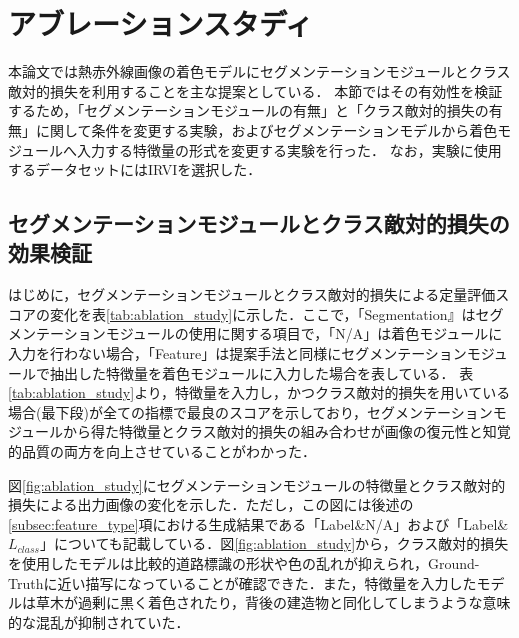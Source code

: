 \documentclass[11pt,dvipdfmx]{ujreport}
\begin{document}
\section{アブレーションスタディ}
本論文では熱赤外線画像の着色モデルにセグメンテーションモジュールとクラス敵対的損失を利用することを主な提案としている．
本節ではその有効性を検証するため，「セグメンテーションモジュールの有無」と「クラス敵対的損失の有無」に関して条件を変更する実験，およびセグメンテーションモデルから着色モジュールへ入力する特徴量の形式を変更する実験を行った．
なお，実験に使用するデータセットにはIRVIを選択した．\par

\subsection{セグメンテーションモジュールとクラス敵対的損失の効果検証}
\label{subsec:segmentation_and_class_loss}
はじめに，セグメンテーションモジュールとクラス敵対的損失による定量評価スコアの変化を表\ref{tab:ablation_study}に示した．ここで，「Segmentation』はセグメンテーションモジュールの使用に関する項目で，「N/A」は着色モジュールに入力を行わない場合，「Feature」は提案手法と同様にセグメンテーションモジュールで抽出した特徴量を着色モジュールに入力した場合を表している．
表\ref{tab:ablation_study}より，特徴量を入力し，かつクラス敵対的損失を用いている場合(最下段)が全ての指標で最良のスコアを示しており，セグメンテーションモジュールから得た特徴量とクラス敵対的損失の組み合わせが画像の復元性と知覚的品質の両方を向上させていることがわかった．\par
図\ref{fig:ablation_study}にセグメンテーションモジュールの特徴量とクラス敵対的損失による出力画像の変化を示した．ただし，この図には後述の\ref{subsec:feature_type}項における生成結果である「Label\&N/A」および「Label\&$L_{class}$」についても記載している．図\ref{fig:ablation_study}から，クラス敵対的損失を使用したモデルは比較的道路標識の形状や色の乱れが抑えられ，Ground-Truthに近い描写になっていることが確認できた．また，特徴量を入力したモデルは草木が過剰に黒く着色されたり，背後の建造物と同化してしまうような意味的な混乱が抑制されていた．\par
\end{document}
